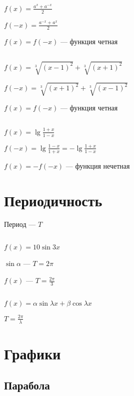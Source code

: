 \documentclass{article}
\begin{document}
$f(x) = \frac{a^x + a^{-x}}{2}$

$f(-x) = \frac{a^{-x} + a^x}{2}$

$f(x) = f(-x)$ --- функция четная

\subsection{}

$f(x) = \sqrt[3]{(x - 1)^2} + \sqrt[3]{(x + 1)^2}$

$f(-x) = \sqrt[3]{(x + 1)^2} + \sqrt[3]{(x - 1)^2}$

$f(x) = f(-x)$ --- функция четная

\subsection{}

$f(x) = \lg{\frac{1 + x}{1 - x}}$

$f(-x) = \lg{\frac{1 - x}{1 + x}} = -\lg{\frac{1 + x}{1 - x}}$

$f(x) = -f(-x)$ --- функция нечетная

\section{Периодичность}

Период --- $T$

\subsection{}

$f(x) = 10\sin{3x}$

$\sin{\alpha}$ --- $T = 2\pi$

$f(x)$ --- $T = \frac{2\pi}{3}$

\subsection{}

$f(x) = \alpha \sin{\lambda x} + \beta \cos{\lambda x}$

$T = \frac{2\pi}{\lambda}$

\section{Графики}

\subsection{Парабола}
\end{document}
